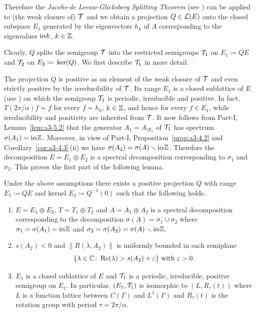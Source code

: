Therefore the \emph{Jacobs-de Leeuw-Glicksberg Splitting Theorem} (see \textcite[Chapter 2, Theorem 4.4 and 4.5]{krengel:1985}) can be applied to (the weak closure of) $\mathcal{T}$ and we obtain a projection $Q \in \mathcal{L}(E)$ onto the closed subspace $E_{1}$ generated by the eigenvectors $h_{k}$ of\/ $A$ corresponding to the eigenvalues $\mathrm{i}\alpha k$, $k \in \mathbb{Z}$.

Clearly, $Q$ splits the semigroup $\mathcal{T}$ into the restricted semigroups $\mathcal{T}_{1}$ on $E_{1} \coloneq QE$ and $\mathcal{T}_{2}$ on $E_{2} \coloneq \mathop{}\mathrm{ker}(Q)$.
We first describe $\mathcal{T}_{1}$ in more detail.

The projection $Q$ is positive as an element of the weak closure of\/ $\mathcal{T}$ and even strictly positive by the irreducibility of\/ $\mathcal{T}$.
Its range $E_{1}$ is a closed sublattice of\/ $E$ (use \textcite[Proposition III.11.5]{schaefer:1974}) on which the semigroup $\mathcal{T}_{1}$ is periodic, irreducible and positive.
In fact, $T(2\pi/\alpha)f = f$ for every $f = h_{k}$, $k \in \mathbb{Z}$, and hence for every $f \in E_{1}$, while irreducibility and positivity are inherited from $\mathcal{T}$.
It now follows from 
Part-I, Lemma~\ref{lem:a3-5.2}
that the generator $A_{1} = A_{|E_{1}}$ of\/ $\mathcal{T}_{1}$ has spectrum $\sigma(A_{1}) = \mathrm{i}\alpha\mathbb{Z}$.
Moreover, in view of 
Part-I, Proposition~\ref{prop:a3-4.2} and Corollary~\ref{cor:a3-4.3}\,(ii) 
we have $\sigma(A_{2}) = \sigma(A) \smallsetminus \mathrm{i}\alpha\mathbb{Z}$.
Therefore the decomposition $E = E_{1} \oplus E_{2}$ is a spectral decomposition corresponding to $\sigma_{1}$ and $\sigma_{2}$.
This proves the first part of the following lemma.
\begin{lemma}\label{lem:c4-2.12}%
Under the above assumptions there exists a positive projection $Q$ with range $E_{1} \coloneq QE$ and kernel $E_{2} \coloneq Q^{-1}(0)$ such that the following holds.
\begin{enumerate}[\upshape (i)]
\item \label{lem:c4-2.12-1}
$E = E_{1} \oplus E_{2}$, $T = T_{1} \oplus T_{2}$ and $A = A_{1} \oplus A_{2}$ is a spectral decomposition corresponding to the decomposition $\sigma(A) = \sigma_{1} \cup \sigma_{2}$ where $\sigma_{1} = \sigma(A_{1}) = \mathrm{i}\alpha\mathbb{Z}$ and $\sigma_{2} = \sigma(A_{2}) = \sigma(A) \smallsetminus \mathrm{i}\alpha\mathbb{Z}$.

\item \label{lem:c4-2.12-2}
$s(A_{2}) < 0$ and $\|R(\lambda,A_{2})\|$ is uniformly bounded in each semiplane
\[
\{\lambda \in \C \colon \Re(\lambda) > s(A_{2}) + \epsilon\} \text{ with } \epsilon > 0.
\]

\item \label{lem:c4-2.12-3}
$E_{1}$ is a closed sublattice of\/ $E$ and $\mathcal{T}_{1}$ is a periodic, irreducible, positive semigroup on $E_{1}$.
In particular, $(E_{1},\mathcal{T}_{1})$ is isomorphic to $(L,R_{\tau}(t))$ where $L$ is a function lattice between $C(\Gamma)$ and $L^{1}(\Gamma)$ and $R_{\tau}(t)$ is the rotation group with period $\tau = 2\pi/\alpha$.
\end{enumerate}
\end{lemma}
